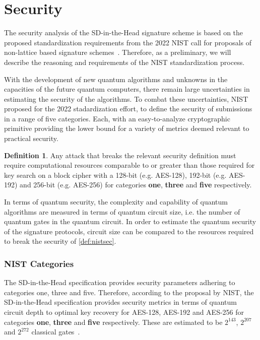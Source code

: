 \documentclass[11pt]{report}
\theoremstyle{definition}
\newtheorem{definition}{Definition}[section]
\theoremstyle{plain}
\begin{document}
\section{Security}

The security analysis of the SD-in-the-Head signature scheme is based on the proposed standardization requirements from the 2022 NIST call for proposals of non-lattice based signature schemes~\cite{nistcall}. Therefore, as a preliminary, we will describe the reasoning and requirements of the NIST standardization process.

With the development of new quantum algorithms and unknowns in the capacities of the future quantum computers, there remain large uncertainties in estimating the security of the algorithms. To combat these uncertainties, NIST proposed for the 2022 stadardization effort, to define the security of submissions in a range of five categories. Each, with an easy-to-analyze cryptographic primitive providing the lower bound for a variety of metrics deemed relevant to practical security.

\begin{definition}\label{def:nistsec}
  Any attack that breaks the relevant security definition must require computational resources comparable to or greater than those required for key search on a block cipher with a 128-bit (e.g. AES-128), 192-bit (e.g. AES-192) and 256-bit (e.g. AES-256) for categories \textbf{one}, \textbf{three} and \textbf{five} respectively.
\end{definition}

In terms of quantum security, the complexity and capability of quantum algorithms are measured in terms of quantum circuit size, i.e. the number of quantum gates in the quantum circuit. In order to estimate the quantum security of the signature protocols, circuit size can be compared to the resources required to break the security of \autoref{def:nistsec}.

\subsubsection{NIST Categories}

The SD-in-the-Head specification provides security parameters adhering to categories one, three and five. Therefore, according to the proposal by NIST, the SD-in-the-Head specification provides security metrics in terms of quantum circuit depth to optimal key recovery for AES-128, AES-192 and AES-256 for categories \textbf{one}, \textbf{three} and \textbf{five} respectively. These are estimated to be $2^{143}$, $2^{207}$ and $2^{272}$ classical gates~\cite{nistcall}.
\end{document}
